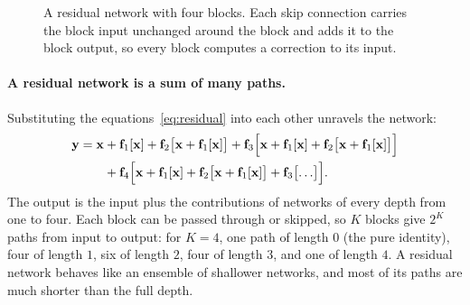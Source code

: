 \begin{figure}[ht]
  \centering
  \caption{A residual network with four blocks. Each skip connection carries the
  block input unchanged around the block and adds it to the block output, so
  every block computes a correction to its input.}
  \label{fig:residual-chain}
\end{figure}

\paragraph{A residual network is a sum of many paths.}
Substituting the equations~\eqref{eq:residual} into each other unravels the
network:
\begin{equation}
  \begin{aligned}
  \mathbf{y} = \mathbf{x}
    &+ \mathbf{f}_1[\mathbf{x}]
     + \mathbf{f}_2\bigl[\mathbf{x} + \mathbf{f}_1[\mathbf{x}]\bigr]
     + \mathbf{f}_3\Bigl[\mathbf{x} + \mathbf{f}_1[\mathbf{x}]
       + \mathbf{f}_2\bigl[\mathbf{x} + \mathbf{f}_1[\mathbf{x}]\bigr]\Bigr] \\
    &+ \mathbf{f}_4\Bigl[\mathbf{x} + \mathbf{f}_1[\mathbf{x}]
       + \mathbf{f}_2\bigl[\mathbf{x} + \mathbf{f}_1[\mathbf{x}]\bigr]
       + \mathbf{f}_3\bigl[\ldots\bigr]\Bigr] .
  \end{aligned}
\end{equation}
\noindent
The output is the input plus the contributions of networks of every depth from
one to four. Each block can be passed through or skipped, so $K$ blocks give
$2^K$ paths from input to output: for $K = 4$, one path of length $0$ (the pure
identity), four of length $1$, six of length $2$, four of length $3$, and one of
length $4$. A residual network behaves like an ensemble of shallower networks,
and most of its paths are much shorter than the full depth.

